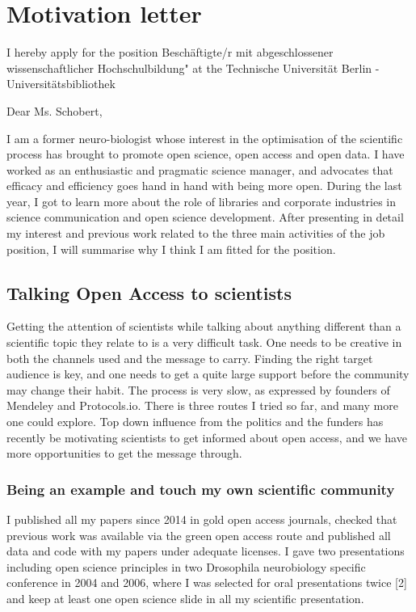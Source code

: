 \section* {Motivation letter}

I hereby apply for the position Besch\"{a}ftigte/r mit abgeschlossener wissenschaftlicher Hochschulbildung" at the Technische Universit\"{a}t Berlin - Universit\"{a}tsbibliothek
\vspace {0.5cm} 

Dear Ms. Schobert,

I am a former neuro-biologist whose interest in the optimisation of the scientific process has brought to promote open science, open access and open data. I have worked as an enthusiastic and pragmatic science manager, and advocates that efficacy and efficiency goes hand in hand with being more open. During the last year, I got to learn more about the role of libraries and corporate industries in science communication and open science development. After presenting in detail my interest and previous work related to the three main activities of the job position, I will summarise why I think I am fitted for the position.





\subsection*{Talking Open Access to scientists}

Getting the attention of scientists while talking about anything different than a scientific topic they relate to is a very difficult task. One needs to be creative in both the channels used and the message to carry. Finding the right target audience is key, and one needs to get a quite large support before the community may change their habit. The process is very slow, as expressed by founders of Mendeley and Protocols.io. There is three routes I tried so far, and many more one could explore. Top down influence from the politics and the funders has recently be motivating scientists to get informed about open access, and we have more opportunities to get the message through.

\subsubsection*{Being an example and touch my own scientific community}
I published all my papers since 2014 in gold open access journals, checked that previous work was available via the green open access route and published all data and code with my papers under adequate licenses. I gave two presentations including open science principles in two Drosophila neurobiology specific conference in 2004 and 2006, where I was selected for oral presentations twice [2] and keep at least one open science slide in all my scientific presentation.
